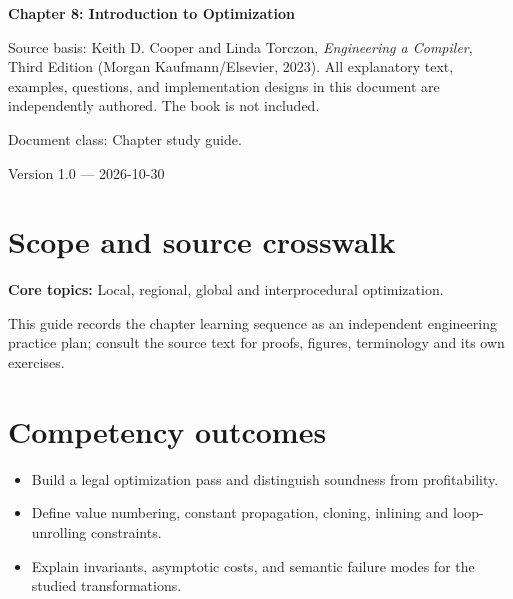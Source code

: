 \documentclass[10pt,letterpaper]{article}
\begin{document}
\begin{titlepage}
\centering\vspace*{1.0in}
{\Huge\bfseries\textcolor{CompilerBlue}{Chapter 8: Introduction to Optimization}\par}
\vspace{.22in}{\Large Critical reading, original exercises, evidence and review\par}
\vspace{.4in}{\large Compiler Engineering Documentation Suite\par}
\vfill
\begin{minipage}{.86\linewidth}\small
Source basis: Keith D. Cooper and Linda Torczon, \emph{Engineering a Compiler}, Third Edition (Morgan Kaufmann/Elsevier, 2023). All explanatory text, examples, questions, and implementation designs in this document are independently authored. The book is not included.\par\medskip
Document class: Chapter study guide.
\end{minipage}
\vfill\textcolor{CompilerGray}{Version 1.0 --- 2026-10-30}\par
\end{titlepage}
\tableofcontents\clearpage
\section{Scope and source crosswalk}
\textbf{Core topics:} Local, regional, global and interprocedural optimization.

This guide records the chapter learning sequence as an independent engineering practice plan; consult the source text for proofs, figures, terminology and its own exercises.

\section{Competency outcomes}
\begin{itemize}
\item Build a legal optimization pass and distinguish soundness from profitability.
\item Define value numbering, constant propagation, cloning, inlining and loop-unrolling constraints.
\item Explain invariants, asymptotic costs, and semantic failure modes for the studied transformations.
\end{itemize}
\end{document}
